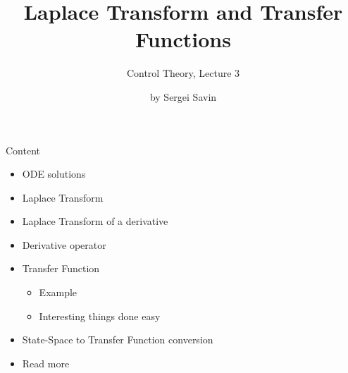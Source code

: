 \documentclass{beamer}
\title{Laplace Transform and Transfer Functions}
\subtitle{Control Theory, Lecture 3}
\author{by Sergei Savin}
\date{\mydate}
\begin{document}
\maketitle


\begin{frame}{Content}

\begin{itemize}
\item ODE solutions
\item Laplace Transform
\item Laplace Transform of a derivative
\item Derivative operator
\item Transfer Function
    \begin{itemize}
    \item Example
    \item Interesting things done easy
    \end{itemize}
\item State-Space to Transfer Function conversion
\item Read more
\end{itemize}

\end{frame}
\end{document}
